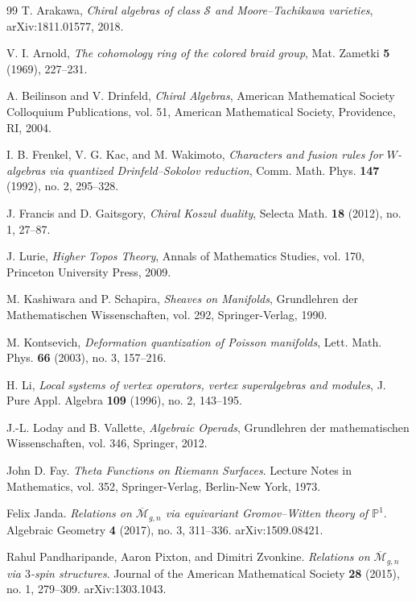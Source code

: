 \begin{thebibliography}{99}
 T. Arakawa, \emph{Chiral algebras of class $\mathcal{S}$ and Moore--Tachikawa varieties}, arXiv:1811.01577, 2018.

 V. I. Arnold, \emph{The cohomology ring of the colored braid group}, Mat. Zametki \textbf{5} (1969), 227--231.

 A. Beilinson and V. Drinfeld, \emph{Chiral Algebras}, American Mathematical Society Colloquium Publications, vol. 51, American Mathematical Society, Providence, RI, 2004.

 I. B. Frenkel, V. G. Kac, and M. Wakimoto, \emph{Characters and fusion rules for $W$-algebras via quantized Drinfeld--Sokolov reduction}, Comm. Math. Phys. \textbf{147} (1992), no. 2, 295--328.

 J. Francis and D. Gaitsgory, \emph{Chiral Koszul duality}, Selecta Math. \textbf{18} (2012), no. 1, 27--87.

 J. Lurie, \emph{Higher Topos Theory}, Annals of Mathematics Studies, vol. 170, Princeton University Press, 2009.

 M. Kashiwara and P. Schapira, \emph{Sheaves on Manifolds}, Grundlehren der Mathematischen Wissenschaften, vol. 292, Springer-Verlag, 1990.

 M. Kontsevich, \emph{Deformation quantization of Poisson manifolds}, Lett. Math. Phys. \textbf{66} (2003), no. 3, 157--216.

H. Li, \emph{Local systems of vertex operators, vertex superalgebras and modules}, J. Pure Appl. Algebra \textbf{109} (1996), no. 2, 143--195.

 J.-L. Loday and B. Vallette, \emph{Algebraic Operads}, Grundlehren der mathematischen Wissenschaften, vol. 346, Springer, 2012.

John D. Fay.
\textit{Theta Functions on Riemann Surfaces}.
Lecture Notes in Mathematics, vol. 352, Springer-Verlag, Berlin-New York, 1973.

Felix Janda.
\textit{Relations on $\overline{\mathcal{M}}_{g,n}$ via equivariant
Gromov--Witten theory of $\mathbb{P}^1$}.
Algebraic Geometry \textbf{4} (2017), no. 3, 311--336.
arXiv:1509.08421.

Rahul Pandharipande, Aaron Pixton, and Dimitri Zvonkine.
\textit{Relations on $\overline{\mathcal{M}}_{g,n}$ via $3$-spin
structures}.
Journal of the American Mathematical Society \textbf{28} (2015),
no. 1, 279--309. arXiv:1303.1043.


\end{thebibliography}
